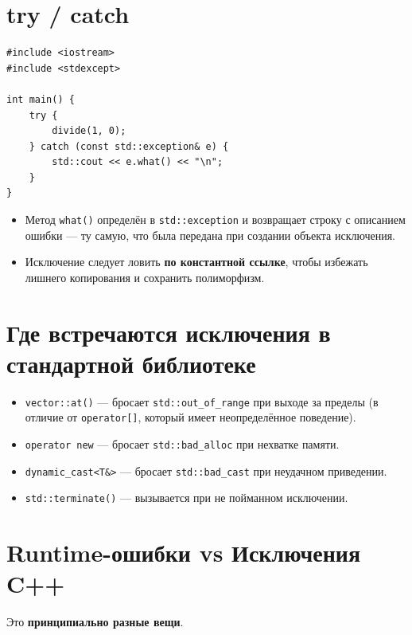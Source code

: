 \documentclass[a4paper,12pt]{article}
\begin{document}
\section{try / catch}

\begin{lstlisting}
#include <iostream>
#include <stdexcept>

int main() {
    try {
        divide(1, 0);
    } catch (const std::exception& e) {
        std::cout << e.what() << "\n";
    }
}
\end{lstlisting}

\begin{itemize}
    \item Метод \texttt{what()} определён в \texttt{std::exception}
          и возвращает строку с описанием ошибки --- ту самую, что
          была передана при создании объекта исключения.
    \item Исключение следует ловить \textbf{по константной ссылке},
          чтобы избежать лишнего копирования и сохранить полиморфизм.
\end{itemize}

\section{Где встречаются исключения в стандартной библиотеке}

\begin{itemize}
    \item \texttt{vector::at()} --- бросает \texttt{std::out\_of\_range}
          при выходе за пределы (в отличие от \texttt{operator[]},
          который имеет неопределённое поведение).
    \item \texttt{operator new} --- бросает \texttt{std::bad\_alloc}
          при нехватке памяти.
    \item \texttt{dynamic\_cast<T\&>} --- бросает \texttt{std::bad\_cast}
          при неудачном приведении.
    \item \texttt{std::terminate()} --- вызывается при не пойманном
          исключении.
\end{itemize}

\section{Runtime-ошибки vs Исключения C++}

Это \textbf{принципиально разные вещи}.
\end{document}
